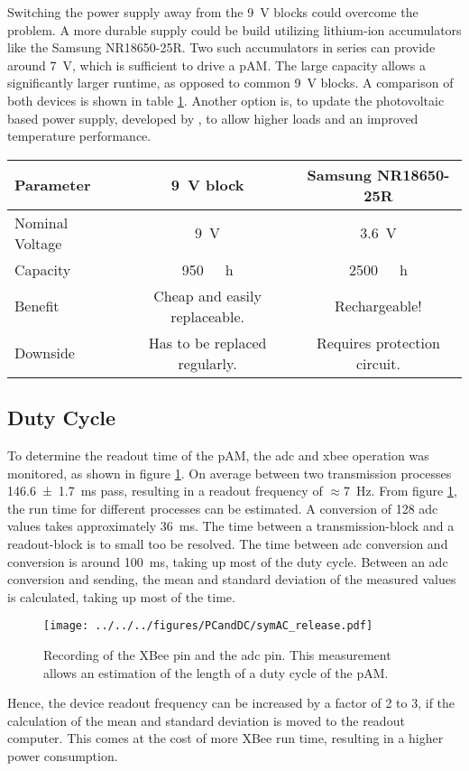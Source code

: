 Switching the power supply away from the \SI{9}{\volt} blocks could overcome the problem. A more durable supply could be build utilizing lithium-ion accumulators like the Samsung NR18650-25R. Two such accumulators in series can provide around \SI{7}{\volt}, which is sufficient to drive a \ac{pAM}. The large capacity allows a significantly larger runtime, as opposed to common \SI{9}{\volt} blocks. A comparison of both devices is shown in table \ref{tab:blockvslition}. Another option is, to update the photovoltaic based power supply, developed by \cite{rudolph}, to allow higher loads and an improved temperature performance.
\begin{table}
	\centering
	\begin{tabular}{lcc}
		\hline
		Parameter& \SI{9}{\volt} block \cite{blocks} & Samsung NR18650-25R \cite{samsung} \\ \hline
		Nominal Voltage & \SI{9}{\volt} & \SI{3.6}{\volt}\\
	 Capacity & \SI{950}{\milli\amp\hour} & \SI{2500}{\milli\amp\hour} \\
	 Benefit & Cheap and easily replaceable. & Rechargeable!\\
	 Downside & Has to be replaced regularly. & Requires protection circuit.\\		
		\hline
	\end{tabular}
	\label{tab:blockvslition}
\end{table}

\subsection{Duty Cycle}
To determine the readout time of the \ac{pAM}, the \ac{adc} and \acs{xbee} operation was monitored, as shown in figure \ref{fig:meas:dutycycle}. On average between two transmission processes \SI{146.6\pm1.7}{\milli\second} pass, resulting in a readout frequency of $\approx$\SI{7}{\hertz}. From figure \ref{fig:meas:dutycycle}, the run time for different processes can be estimated. A conversion of 128 \ac{adc} values takes approximately \SI{36}{\milli\second}. The time between a transmission-block and a readout-block is to small too be resolved. The time between \ac{adc} conversion and conversion is around \SI{100}{\milli\second}, taking up most of the duty cycle. Between an \ac{adc} conversion and sending, the mean and standard deviation of the measured values is calculated, taking up most of the time. 
\begin{figure} 
	\centering
	\texttt{[image: ../../../figures/PCandDC/symAC\_release.pdf]}
	\caption{Recording of the XBee  pin and the \ac{adc}  pin. This measurement allows an estimation of the length of a duty cycle of the \ac{pAM}.}
	\label{fig:meas:dutycycle}
\end{figure}
Hence, the device readout frequency can be increased by a factor of 2 to 3, if the calculation of the mean and standard deviation is moved to the readout computer. This comes at the cost of more XBee run time, resulting in a higher power consumption.

